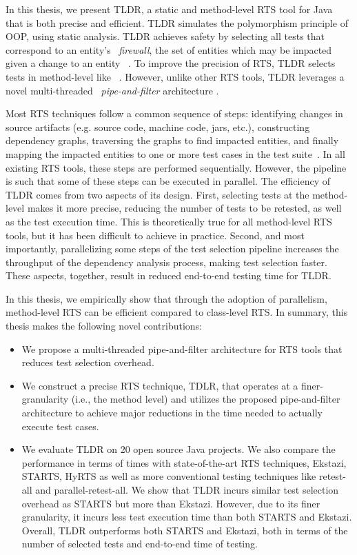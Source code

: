In this thesis, we present TLDR, a static and method-level RTS tool for Java that is both precise and efficient. TLDR simulates the polymorphism principle of OOP, using static analysis. TLDR achieves safety by selecting all tests that correspond to an entity's ~\textit{firewall}, the set of entities which may be impacted given a change to an entity ~\cite{white1992firewall, white2008extended, white2003firewall}. To improve the precision of RTS, TLDR selects tests in method-level like ~\cite{faulttracer}. However, unlike other RTS tools, TLDR leverages a novel multi-threaded ~\textit{pipe-and-filter} architecture \cite{taylor_sa_book}.

Most RTS techniques follow a common sequence of steps: identifying changes in source artifacts (e.g. source code, machine code, jars, etc.), constructing dependency graphs, traversing the graphs to find impacted entities, and finally mapping the impacted entities to one or more test cases in the test suite~\cite{hyrts, ekstazi, gligoric2015ekstazi, b37, starts, faulttracer}. In all existing RTS tools, these steps are performed sequentially. However, the pipeline is such that some of these steps can be executed in parallel. The efficiency of TLDR comes from two aspects of its design. First, selecting tests at the method-level makes it more precise, reducing the number of tests to be retested, as well as the test execution time. This is theoretically true for all method-level RTS tools, but it has been difficult to achieve in practice. Second, and most importantly, parallelizing some steps of the test selection pipeline increases the throughput of the dependency analysis process, making test selection faster. These aspects, together, result in reduced end-to-end testing time for TLDR.

In this thesis, we empirically show that through the adoption of parallelism, method-level RTS can be efficient compared to class-level RTS. In summary, this thesis makes the following novel contributions: 
\begin{itemize}
	\item We propose a multi-threaded pipe-and-filter architecture for RTS tools that reduces test selection overhead.
	\item We construct a precise RTS technique, TDLR, that operates at a finer-granularity (i.e., the method level) and utilizes the proposed pipe-and-filter architecture to achieve major reductions in the time needed to actually execute test cases.
	\item We evaluate TLDR on 20 open source Java projects. We also compare the performance in terms of times with state-of-the-art RTS techniques, Ekstazi, STARTS, HyRTS as well as more conventional testing techniques like retest-all and parallel-retest-all. We show that TLDR incurs similar test selection overhead as STARTS but more than Ekstazi. However, due to its finer granularity, it incurs less test execution time than both STARTS and Ekstazi. Overall, TLDR outperforms both STARTS and Ekstazi, both in terms of the number of selected tests and end-to-end time of testing. 
\end{itemize} 


